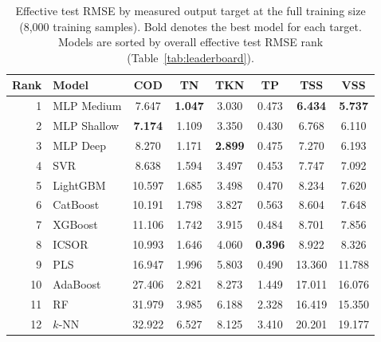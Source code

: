 \documentclass[11pt]{article}
\begin{document}
\begin{table}[htbp]
\centering
\caption{Effective test RMSE by measured output target at the full training size (8{,}000 training samples). Bold denotes the best model for each target. Models are sorted by overall effective test RMSE rank (Table~\ref{tab:leaderboard}).}
\label{tab:per_target}
\small
\begin{tabular}{@{}rlcccccc@{}}
\toprule
\textbf{Rank} & \textbf{Model} & \textbf{COD} & \textbf{TN} & \textbf{TKN} & \textbf{TP} & \textbf{TSS} & \textbf{VSS} \\
\midrule
1 & MLP Medium   & 7.647  & \textbf{1.047}  & 3.030  & 0.473  & \textbf{6.434}  & \textbf{5.737} \\
2 & MLP Shallow  & \textbf{7.174}  & 1.109  & 3.350  & 0.430  & 6.768  & 6.110 \\
3 & MLP Deep     & 8.270  & 1.171  & \textbf{2.899}  & 0.475  & 7.270  & 6.193 \\
4 & SVR          & 8.638  & 1.594  & 3.497  & 0.453  & 7.747  & 7.092 \\
5 & LightGBM     & 10.597 & 1.685  & 3.498  & 0.470  & 8.234  & 7.620 \\
6 & CatBoost     & 10.191 & 1.798  & 3.827  & 0.563  & 8.604  & 7.648 \\
7 & XGBoost      & 11.106 & 1.742  & 3.915  & 0.484  & 8.701  & 7.856 \\
8 & ICSOR        & 10.993 & 1.646  & 4.060  & \textbf{0.396}  & 8.922  & 8.326 \\
9 & PLS          & 16.947 & 1.996  & 5.803  & 0.490  & 13.360 & 11.788 \\
10 & AdaBoost    & 27.406 & 2.821  & 8.273  & 1.449  & 17.011 & 16.076 \\
11 & RF          & 31.979 & 3.985  & 6.188  & 2.328  & 16.419 & 15.350 \\
12 & $k$-NN      & 32.922 & 6.527  & 8.125  & 3.410  & 20.201 & 19.177 \\
\bottomrule
\end{tabular}
\end{table}
\end{document}
